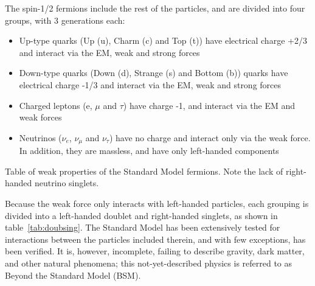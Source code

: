 \documentclass[/main.tex]{subfiles}
\begin{document}
The spin-1/2 fermions include the rest of the particles, and are divided into four groups, with 3 generations each:
\begin{itemize}
\item Up-type quarks (Up (u), Charm (c) and Top (t)) have electrical charge +2/3 and interact via the EM, weak and strong forces
\item Down-type quarks (Down (d), Strange (s) and Bottom (b)) quarks have electrical charge -1/3 and interact via the EM, weak and strong forces
\item Charged leptons (e, $\mu$ and $\tau$) have charge -1, and interact via the EM and weak forces
\item Neutrinos ($\nu_e$, $\nu_\mu$ and $\nu_\tau$) have no charge and interact only via the weak force. In addition, they are massless, and have only left-handed components
\end{itemize}
\begin{table}[h]
  \caption[Weak properties of Fermions]{\label{tab:doubsing}
    Table of weak properties of the Standard Model fermions. Note the lack of right-handed neutrino singlets.
  }
  \centering
  
\end{table}
Because the weak force only interacts with left-handed particles, each grouping is divided into a left-handed doublet and right-handed singlets, as shown in table~\ref{tab:doubsing}.
The Standard Model has been extensively tested for interactions between the particles included therein, and with few exceptions, has been verified.
It is, however, incomplete, failing to describe gravity, dark matter, and other natural phenomena; this not-yet-described physics is referred to as Beyond the Standard Model (BSM).
\end{document}
